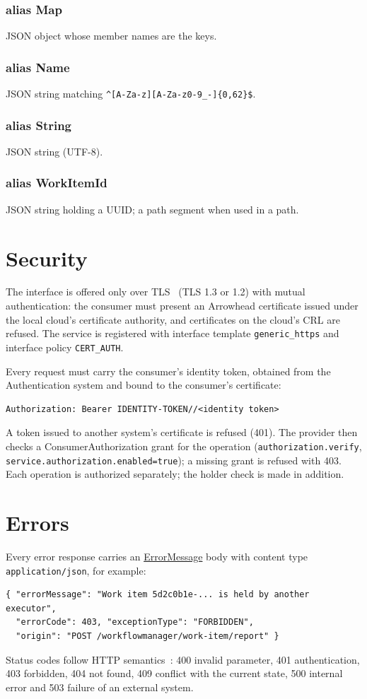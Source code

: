 \documentclass[a4paper]{arrowhead}
\newcommand{\mref}[1]{{\textcolor{ArrowheadPurple}{\hyperref[sec:model:#1]{#1}}}}
\newcommand{\pdef}[1]{{\textcolor{ArrowheadGrey}{#1\label{sec:model:primitives:#1}\label{sec:model:primitives:#1s}}}}
\begin{document}
\subsubsection*{alias \pdef{Map}}
JSON object whose member names are the keys.

\subsubsection*{alias \pdef{Name}}
JSON string matching \texttt{\^{}[A-Za-z][A-Za-z0-9\_-]\{0,62\}\$}.

\subsubsection*{alias \pdef{String}}
JSON string (UTF-8).

\subsubsection*{alias \pdef{WorkItemId}}
JSON string holding a UUID; a path segment when used in a path.



\section{Security}
\label{sec:security}
The interface is offered only over TLS~\cite{rfc8446} (TLS 1.3 or 1.2) with mutual authentication: the consumer must
present an Arrowhead certificate issued under the local cloud's certificate authority, and certificates on the
cloud's CRL are refused. The service is registered with interface template \texttt{generic\_https} and interface
policy \texttt{CERT\_AUTH}.

Every request must carry the consumer's identity token, obtained from the Authentication system and bound to the
consumer's certificate:
\begin{lstlisting}
Authorization: Bearer IDENTITY-TOKEN//<identity token>
\end{lstlisting}
A token issued to another system's certificate is refused (401). The provider then checks a ConsumerAuthorization
grant for the operation (\texttt{authorization.verify}, \texttt{service.authorization.enabled=true}); a missing grant is
refused with 403. Each operation is authorized separately; the holder check is made in addition.


\section{Errors}
\label{sec:errors}
Every error response carries an \mref{ErrorMessage} body with content type \texttt{application/json}, for example:
\begin{lstlisting}
{ "errorMessage": "Work item 5d2c0b1e-... is held by another executor",
  "errorCode": 403, "exceptionType": "FORBIDDEN",
  "origin": "POST /workflowmanager/work-item/report" }
\end{lstlisting}
Status codes follow HTTP semantics~\cite{rfc9110}: 400 invalid parameter, 401 authentication, 403 forbidden, 404 not
found, 409 conflict with the current state, 500 internal error and 503 failure of an external system.
\end{document}

